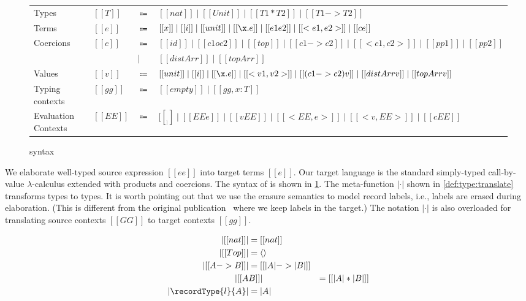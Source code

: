 \begin{figure}[t]
  \centering
\begin{tabular}{llll} \toprule
  Types & $[[T]]$ & $\Coloneqq$ & $[[nat]] \mid [[Unit]] \mid [[T1 * T2]] \mid [[T1 -> T2]] $ \\
  Terms & $[[e]]$ & $\Coloneqq$ & $[[x]] \mid [[i]] \mid [[unit]] \mid [[\x . e]] \mid [[e1 e2]] \mid [[<e1, e2>]] \mid [[c e]]$ \\
  Coercions & $[[c]]$ & $\Coloneqq$ & $ [[id]] \mid [[c1 o c2]] \mid [[top]] \mid [[c1 -> c2]] \mid [[<c1, c2>]] \mid [[pp1]] \mid [[pp2]] $ \\
  &  &  $\mid$ & $   [[distArr]] \mid [[topArr]]  $ \\
  Values & $[[v]]$ & $\Coloneqq$ & $[[unit]] \mid [[i]] \mid [[\x.e]] \mid  [[<v1, v2>]] \mid [[(c1 -> c2) v]] \mid [[distArr v]] \mid [[topArr v]] $ \\
  Typing contexts & $[[gg]]$ & $\Coloneqq$ & $[[empty]] \mid [[gg , x : T]]$ \\
  Evaluation Contexts & $[[EE]]$ & $\Coloneqq$ &  $  [[__]] \mid [[EE e]] \mid [[v EE]] \mid [[ < EE , e >  ]] \mid [[ < v , EE > ]] \mid [[ c EE  ]]$ \\ \bottomrule
\end{tabular}
  \caption{\tname syntax}
  \label{fig:target}
\end{figure}

We elaborate well-typed source expression $[[ee]]$ into target terms $[[e]]$.
Our target language \tname is the standard simply-typed call-by-value
$\lambda$-calculus extended with products and coercions. The syntax of \tname is
shown in \cref{fig:target}. The meta-function $| \cdot |$ shown in
\cref{def:type:translate} transforms \namee types to \tname types. It is worth
pointing out that we use the erasure semantics to model record labels, i.e.,
labels are erased during elaboration. (This is different from the original
publication~\citep{bi_et_al:LIPIcs:2018:9227} where we keep labels in the
target.)
The notation $| \cdot |$ is also overloaded for
translating source contexts $[[GG]]$ to target contexts $[[gg]]$.

\begin{definition} \label{def:type:translate}
  \begin{align*}
    | [[nat]] | &= [[nat]] \\
    | [[Top]] | &= \langle \rangle \\
    | [[A -> B]]  | &= [[ | A | -> | B |  ]] \\
    | [[ A & B  ]] | &= [[ | A | * | B |  ]] \\
    | \recordType{l}{A} | &= | A |
  \end{align*}
\end{definition}



